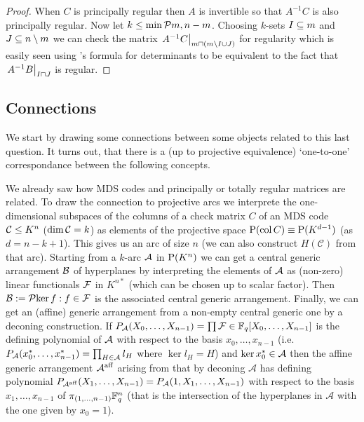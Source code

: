 \begin{proof}
    When $C$ is principally regular then $A$ is invertible so that $A^{-1}C$ is also principally regular. Now let $k\leq \min\set{m,n-m}$. Choosing $k$-sets $I\subseteq m$ and $J\subseteq n\setminus m$ we can check the matrix $\rest{A^{-1}C}_{m\setprod (m\setminus I\setjoin J)}$ for regularity which is easily seen using 's formula for determinants to be equivalent to the fact that $\rest{A^{-1}B}_{I\setprod J}$ is regular.
\end{proof}

\subsection{Connections}

We start by drawing some connections between some objects related to this last question.
It turns out, that there is a (up to projective equivalence) `one-to-one' correspondance between the following concepts.

We already saw how MDS codes and principally or totally regular matrices are related.
To draw the connection to projective arcs we interprete the one-dimensional subspaces of the columns of a check matrix $C$ of an MDS code $\mathcal{C}\leq K^n$ ($\dim\mathcal{C}=k$) as elements of the projective space $\proj(\col C)\iso \P(K^{d-1})$ (as $d=n-k+1$). This gives us an arc of size $n$ (we can also construct $H(\mathcal{C})$ from that arc).
Starting from a $k$-arc $\mathcal{A}$ in $\P(K^n)$ we can get a central generic arrangement $\mathcal{B}$ of hyperplanes by interpreting the elements of $\mathcal{A}$ as (non-zero) linear functionals $\mathcal{F}$ in $K^{n\ast}$ (which can be chosen up to scalar factor). Then $\cB:=\set{\ker f:f\in \cF}$ is the associated central generic arrangement.
Finally, we can get an (affine) generic arrangement from a non-empty central generic one by a deconing construction. If $P_{\mathcal{A}}(X_0,\ldots,X_{n-1})=\prod{\mathcal{F}}\in\mathbb{F}_{q}[X_0,\ldots,X_{n-1}]$ is the defining polynomial of $\mathcal{A}$ with respect to the basis $x_0,\ldots,x_{n-1}$ (i.e. $P_{\mathcal{A}}(x^{\ast}_0,\ldots,x^{\ast}_{n-1})=\prod_{H\in\mathcal{A}}{l_H}$ where $\ker l_H =H$) and $\ker x^{\ast}_0\in\mathcal{A}$ then the affine generic arrangement $\mathcal{A}^{\mathop\mathrm{aff}}$ arising from that by deconing $\mathcal{A}$ has defining polynomial $P_{\mathcal{A}^{\mathop\mathrm{aff}}}(X_1,\ldots,X_{n-1})=P_{\mathcal{A}}(1,X_1,\ldots,X_{n-1})$ with respect to the basis $x_1,\ldots,x_{n-1}$ of $\pi_{(1,\ldots,n-1)}\mathbb{F}_{q}^n$ (that is the intersection of the hyperplanes in $\mathcal{A}$ with the one given by $x_0=1$).

